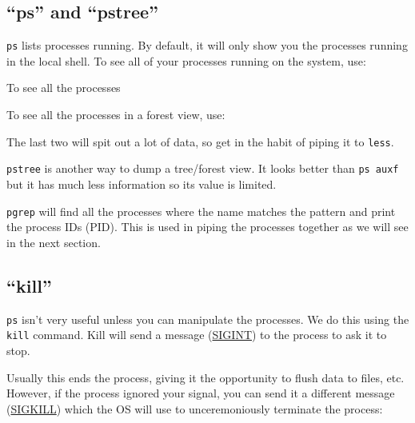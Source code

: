 \subsection{``ps'' and ``pstree''}
\verb|ps| lists processes running. By default, it will only show you the processes
running in the local shell. To see all of your processes running on the system,
use:

\begin{prompt}
\end{prompt}

To see all the processes

\begin{prompt}
\end{prompt}

To see all the processes in a forest view, use:

\begin{prompt}
\end{prompt}

The last two will spit out a lot of data, so get in the habit of piping it to
\verb|less|.

\verb|pstree| is another way to dump a tree/forest view. It looks better than
\verb|ps auxf| but it has much less information so its value is limited.

\verb|pgrep| will find all the processes where the name matches the pattern and
print the process IDs (PID). This is used in piping the processes together as we
will see in the next section.

\subsection{``kill''}
\verb|ps| isn't very useful unless you can manipulate the processes. We do this
using the \verb|kill| command. Kill will send a message
(\href{https://en.wikipedia.org/wiki/Unix_signal#POSIX_signals}{SIGINT}) to the
process to ask it to stop.

\begin{prompt}
\end{prompt}

Usually this ends the process, giving it the opportunity to flush data to files,
etc. However, if the process ignored your signal, you can send it a different
message (\href{https://en.wikipedia.org/wiki/Unix_signal#POSIX_signals}{SIGKILL}) which the OS
will use to unceremoniously terminate the process:


